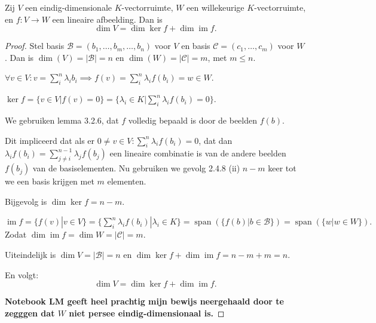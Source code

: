 \begin{stelling}
    Zij $V$ een eindig-dimensionale $K$-vectorruimte, $W$ een willekeurige $K$-vectorruimte,
    en $f \colon V \to W$ een lineaire afbeelding. Dan is
    \[ \dim V = \dim \ker f + \dim \operatorname{im} f. \]
\end{stelling}
\begin{proof}
    Stel basis \(\mathcal{B} = (b_1,\dots, b_m,\dots,b_n)\) voor \(V\) en  basis \(\mathcal{C} = (c_1,\dots,c_m)\) voor \(W\).
    Dan is \(\dim(V) = |\mathcal{B}| = n\) en \(\dim(W) = |\mathcal{C}| = m\), met \(m \leq n\).

    \(\forall v \in V: v = \sum_{i}^{n} \lambda_i b_i \implies f(v) = \sum_{i}^{n} \lambda_i f(b_i) = w \in W \).

    \(\ker f
    = \{v \in V | f(v) = 0\}
    = \{\lambda_i \in K | \sum_{i}^{n} \lambda_i f(b_i) = 0\}
    \).

    We gebruiken lemma 3.2.6, dat \(f\) volledig bepaald is door de beelden \(f(b)\).

    Dit impliceerd dat als er \(0 \neq v \in V: \sum_{i}^{n} \lambda_i f(b_i) = 0 \), dat dan \(\lambda_i f(b_i) =  \sum_{j\neq i}^{n-1}\lambda_j f(b_j)\) een lineaire combinatie is van de andere beelden \(f(b_j)\) van de basiselementen.
    Nu gebruiken we gevolg 2.4.8 (ii) \(n-m\) keer tot we een basis krijgen met \(m\) elementen.

    Bijgevolg is \(\dim\ker f = n-m\).

    \(\operatorname{im} f
     = \{f(v)|v \in V\}
     = \{\sum_{i}^{n} \lambda_i f(b_i)|\lambda_i \in K\}
     = \operatorname{span}(\{f(b)|b\in \mathcal{B}\})
     = \operatorname{span}(\{w|w\in W\}).
     \)
     Zodat \(\dim\operatorname{im} f = \dim W = |\mathcal{C}| = m\).

     Uiteindelijk is \(\dim V = |\mathcal{B}| = n \) en \(\dim\ker f + \dim\operatorname{im} f = n-m+m = n \).

     En volgt:
     \[ \dim V = \dim \ker f + \dim \operatorname{im} f.\]

    \textbf{Notebook LM geeft heel prachtig mijn bewijs neergehaald door te zegggen dat \(W\) niet persee eindig-dimensionaal is.}
\end{proof}

